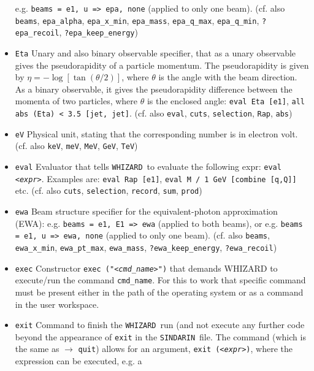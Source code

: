 \documentclass[12pt]{book}
\newcommand{\ttt}[1]{\texttt{#1}}
\newcommand{\whizard}{\ttt{WHIZARD}}
\newcommand{\sindarin}{\ttt{SINDARIN}}
\begin{document}
\begin{itemize}
e.g. \ttt{beams = e1, u => epa, none} (applied to only one
beam). (cf. also \ttt{beams}, \ttt{epa\_alpha}, \ttt{epa\_x\_min},
\ttt{epa\_mass}, \ttt{epa\_q\_max}, \ttt{epa\_q\_min},
\ttt{?epa\_recoil}, \ttt{?epa\_keep\_energy})
\item
\ttt{Eta} \newline
Unary and also binary observable specifier, that as a unary observable
gives the pseudorapidity of a particle momentum. The pseudorapidity is
given by $\eta = - \log \left[ \tan (\theta/2) \right]$, where
$\theta$ is the angle with the beam direction. As a binary
observable, it gives the pseudorapidity difference between the momenta
of two particles, where $\theta$ is the enclosed angle: \ttt{eval Eta
[e1]},  \ttt{all abs (Eta) < 3.5 [jet, jet]}. (cf. also \ttt{eval},
\ttt{cuts}, \ttt{selection}, \ttt{Rap}, \ttt{abs})
\item
\ttt{eV} \newline
Physical unit, stating that the corresponding number is in electron
volt. (cf. also \ttt{keV}, \ttt{meV}, \ttt{MeV}, \ttt{GeV}, \ttt{TeV})
\item
\ttt{eval} \newline
Evaluator that tells \whizard\ to evaluate the following expr:
\ttt{eval {\em <expr>}}. Examples are: \ttt{eval Rap [e1]}, \ttt{eval
  M / 1 GeV [combine [q,Q]]} etc. (cf. also \ttt{cuts},
\ttt{selection}, \ttt{record}, \ttt{sum}, \ttt{prod})
\item
\ttt{ewa} \newline
Beam structure specifier for the equivalent-photon approximation
(EWA): e.g. \ttt{beams = e1, E1 => ewa} (applied to both beams), or
e.g. \ttt{beams = e1, u => ewa, none} (applied to only one
beam). (cf. also \ttt{beams}, \ttt{ewa\_x\_min}, \ttt{ewa\_pt\_max},
\ttt{ewa\_mass}, \ttt{?ewa\_keep\_energy},
\ttt{?ewa\_recoil})
\item
\ttt{exec} \newline
Constructor \ttt{exec ("{\em <cmd\_name>}")} that demands WHIZARD to
execute/run the command \ttt{cmd\_name}. For this to work that
specific command must be present either in the path of the operating
system or as a command in the user workspace.
\item
\ttt{exit} \newline
Command to finish the \whizard\ run (and not execute any further code
beyond the appearance of \ttt{exit} in the \sindarin\ file. The command
(which is the same as $\to$ \ttt{quit}) allows for an argument,
\ttt{exit ({\em <expr>})}, where the expression can be executed, e.g. a

\end{itemize}
\end{document}
